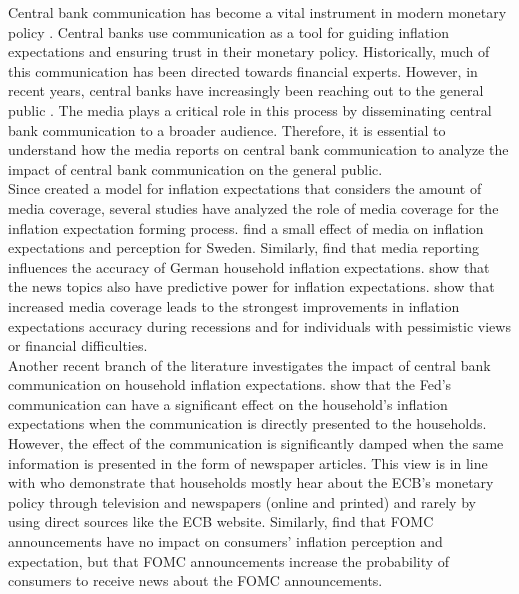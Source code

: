 \documentclass[review]{elsarticle}
\begin{document}
Central bank communication has become a vital instrument in modern monetary policy \citep{Blinderetal2017}. Central banks use communication as a tool for guiding inflation expectations and ensuring trust in their monetary policy. Historically, much of this communication has been directed towards financial experts. However, in recent years, central banks have increasingly been reaching out to the general public \citep{Blinderetal2022}. The media plays a critical role in this process by disseminating central bank communication to a broader audience. Therefore, it is essential to understand how the media reports on central bank communication to analyze the impact of central bank communication on the general public.
%
%
%
\\
Since \cite{Carroll2003} created a model for inflation expectations that considers the amount of media coverage, several studies have analyzed the role of media coverage for the inflation expectation forming process. \cite{Draeger2015} find a small effect of media on inflation expectations and perception for Sweden. Similarly, \cite{LamlaLein2014} find that media reporting influences the accuracy of German household inflation expectations. \citep{Larsen2021} show that the news topics also have predictive power for inflation expectations. \cite{Ehrmann2017} show that increased media coverage leads to the strongest improvements in inflation expectations accuracy during recessions and for individuals with pessimistic views or financial difficulties.  
%
%
\\
%
Another recent branch of the literature investigates the impact of central bank communication on household inflation expectations. \cite{Coibion2022} show that the Fed's communication can have a significant effect on the household's inflation expectations when the communication is directly presented to the households. However, the effect of the communication is significantly damped when the same information is presented in the form of newspaper articles. This view is in line with \cite{Gardt2022} who demonstrate that households mostly hear about the ECB's monetary policy through television and newspapers (online and printed) and rarely by using direct sources like the ECB website. Similarly, \cite{LamalaVinogradov2019} find that FOMC announcements have no impact on consumers' inflation perception and expectation, but that FOMC announcements increase the probability of consumers to receive news about the FOMC announcements. 
\end{document}
